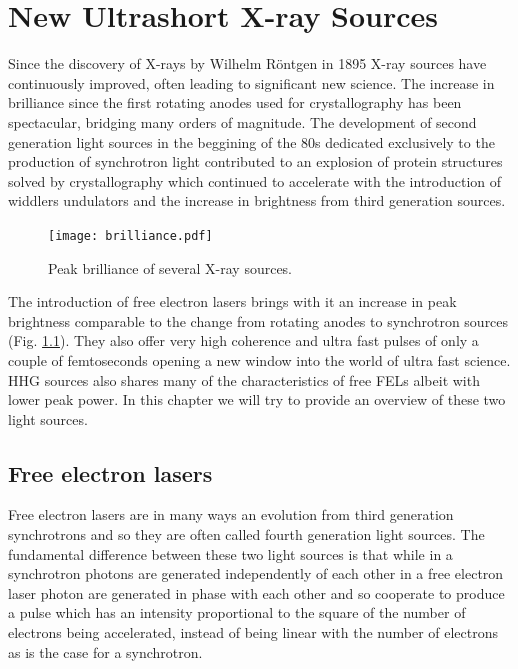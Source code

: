 \chapter{New Ultrashort X-ray Sources}\label{Ultrashort X-ray Sources}\noindent
 
Since the discovery of X-rays by Wilhelm R\"{o}ntgen in 1895 X-ray sources have
continuously improved, often leading to significant new science. The increase in
brilliance since the first rotating anodes used for crystallography has been
spectacular, bridging many orders of magnitude. The development of second
generation light sources in the beggining of the 80s dedicated exclusively to
the production of synchrotron light contributed to an explosion of
protein structures solved by crystallography which continued to accelerate with
the introduction of widdlers undulators and the increase in brightness from
third generation sources.

 
\begin{figure}[h]
\centering
  \texttt{[image: brilliance.pdf]}
  \caption{Peak brilliance of several X-ray sources.}
  \label{Fig:Brilliance}
\end{figure}

The introduction of free electron lasers brings with it an increase in peak
brightness comparable to the change from rotating anodes to synchrotron sources
(Fig. \ref{Fig:Brilliance}). They also offer very high coherence and ultra fast
pulses of only a couple of femtoseconds opening a new window into the world of
ultra fast science. HHG sources also shares many of the characteristics of free
FELs albeit with lower peak power. In this chapter we will try to provide an
overview of these two light sources.

\section{Free electron lasers}

Free electron lasers are in many ways an evolution from third generation
synchrotrons and so they are often called fourth generation light sources. The
fundamental difference between these two light sources is that while in a
synchrotron photons are generated independently of each other in a free electron
laser photon are generated in phase with each other and so cooperate to produce
a pulse which has an intensity proportional to the square of the number of
electrons being accelerated, instead of being linear with the number of
electrons as is the case for a synchrotron.

